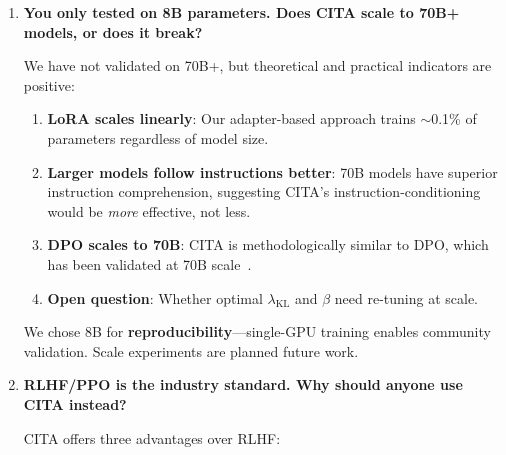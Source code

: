\begin{enumerate}[label=\textbf{Q\arabic*.}, leftmargin=*, itemsep=8pt]
\textbf{Why this matters for instruction-switching}: Instruction-conditioned alignment requires maintaining \textit{multiple} behavioral modes (concise, verbose, formal, casual, etc.). DPO's mode-seeking property~\cite{goyal2024beyond} causes collapse to ONE dominant mode---explaining the 54$\times$ difference on TruthfulQA (DPO: +0.001, CITA: +0.054).

\vspace{4mm}

\item \textbf{You only tested on 8B parameters. Does CITA scale to 70B+ models, or does it break?}

 We have not validated on 70B+, but theoretical and practical indicators are positive:

\begin{enumerate}[leftmargin=*,itemsep=2pt]
    \item \textbf{LoRA scales linearly}: Our adapter-based approach trains $\sim$0.1\% of parameters regardless of model size.

    \item \textbf{Larger models follow instructions better}: 70B models have superior instruction comprehension, suggesting CITA's instruction-conditioning would be \textit{more} effective, not less.

    \item \textbf{DPO scales to 70B}: CITA is methodologically similar to DPO, which has been validated at 70B scale~\cite{rafailov2023direct}.

    \item \textbf{Open question}: Whether optimal $\lambda_{\text{KL}}$ and $\beta$ need re-tuning at scale.
\end{enumerate}

We chose 8B for \textbf{reproducibility}---single-GPU training enables community validation. Scale experiments are planned future work.

\vspace{4mm}

\item \textbf{RLHF/PPO is the industry standard. Why should anyone use CITA instead?}

 CITA offers three advantages over RLHF:


\end{enumerate}
